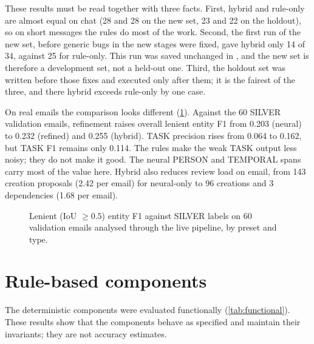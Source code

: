 These results must be read together with three facts. First, hybrid and rule-only are almost equal on chat (28 and 28 on the new set, 23 and 22 on the holdout), so on short messages the rules do most of the work. Second, the first run of the new set, before generic bugs in the new stages were fixed, gave hybrid only 14 of 34, against 25 for rule-only. This run was saved unchanged in , and the new set is therefore a development set, not a held-out one. Third, the holdout set was written before those fixes and executed only after them; it is the fairest of the three, and there hybrid exceeds rule-only by one case.

On real emails the comparison looks different (\cref{fig:silverref}). Against the 60 SILVER validation emails, refinement raises overall lenient entity F1 from 0.203 (neural) to 0.232 (refined) and 0.255 (hybrid). TASK precision rises from 0.064 to 0.162, but TASK F1 remains only 0.114. The rules make the weak TASK output less noisy; they do not make it good. The neural PERSON and TEMPORAL spans carry most of the value here. Hybrid also reduces review load on email, from 143 creation proposals (2.42 per email) for neural-only to 96 creations and 3 dependencies (1.68 per email).

\begin{figure}[t]
\centering
{}
\caption[Refinement on real emails]{Lenient (IoU $\ge 0.5$) entity F1 against SILVER labels on 60 validation emails analysed through the live pipeline, by preset and type.}
\label{fig:silverref}
\end{figure}

\section{Rule-based components}
The deterministic components were evaluated functionally (\cref{tab:functional}). These results show that the components behave as specified and maintain their invariants; they are not accuracy estimates.

